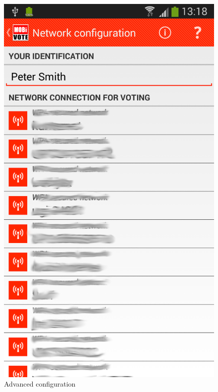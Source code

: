 \documentclass[numbers=noenddot, abstract=on, a4paper, headsepline,
footsepline, oneside, openright, draft=off, listof=leveldown]{scrreprt}
\begin{document}
\begin{figure}[!htb]
	\begin{minipage}{.5\textwidth}
  		\centering
		\includegraphics[height=.4\textheight]{img/screenshots/advanced_network_configuration}
		\caption{Advanced configuration}
		\label{fig:handbook_advancedconfigurationuser}
	\end{minipage}
	\begin{minipage}{.5\textwidth}
  		\centering

\end{minipage}
\end{figure}
\end{document}
